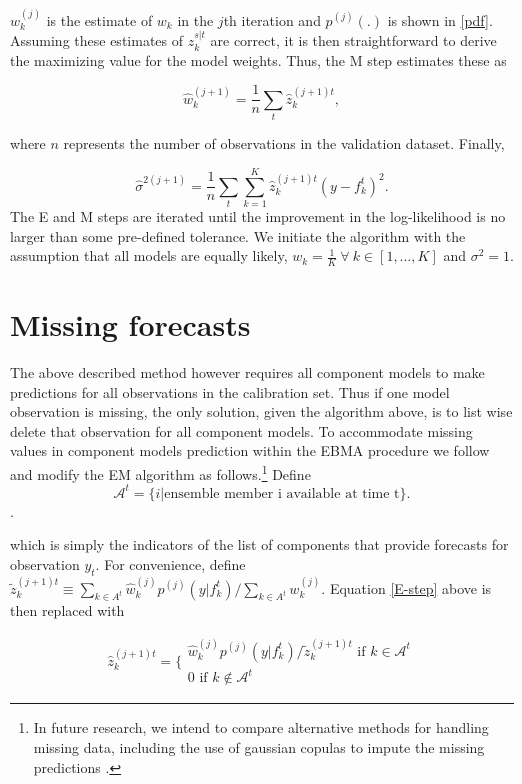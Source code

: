 \documentclass[12pt,fullpage,endnotes]{article}
\begin{document}
$w_k^{(j)}$ is the estimate of $w_k$ in the $j$th iteration and
$p^{(j)}(.)$ is shown in \eqref{pdf}.  Assuming these estimates of
$z_{k}^{s|t}$ are correct, it is then straightforward to derive the
maximizing value for the model weights. Thus, the M step estimates
these as 

\begin{equation}
\label{M-step}
\hat{w}^{(j+1)}_k=\frac{1}{n}\underset{t}{\sum}\hat{z}^{(j+1)t}_{k},
\end{equation}

\noindent where $n$ represents the number of observations in the
validation dataset.  Finally,

\begin{equation}
\label{sigma}
\hat{\sigma}^{2(j+1)}=\frac{1}{n}\underset{t}{\sum}\overset{K}{\underset{k=1}{\sum}}\hat{z}^{(j+1)t}_{k}(y-f_{k}^{t})^2.
\end{equation}
\noindent The E and M steps are iterated until the improvement in the
log-likelihood is no larger than some pre-defined tolerance.  We
initiate the algorithm with the assumption that all models are equally
likely, $w_k = \frac{1}{K} ~ \forall ~ k \in [1, \ldots, K]$ and
$\sigma^2=1$.


\section{Missing forecasts}
\label{missing}
The above described method however requires all component models to make predictions for all observations in the calibration set. Thus if one model observation is missing, the only solution, given the algorithm above, is to list wise delete that observation for all component models. To accommodate missing values in component models prediction within the EBMA procedure we follow \citet{Fraley:2010} and modify the EM algorithm as follows.\footnote{In future research, we intend to compare alternative methods for handling missing data, including the use of gaussian copulas to impute the missing predictions \citep{Hoff:2007}.}  Define $$\mathcal{A}^t = \{i|\mbox{ensemble member i available at time t}\}.$$.

\noindent which is simply the indicators of the list of components that provide forecasts for observation $y_t$.   For convenience, define $\tilde{z}_k^{(j+1)t} \equiv {{\underset{k \in A^t}{\sum}}\hat{w}^{(j)}_kp^{(j)}(y|f_{k}^{t})}/{\underset{k \in A^t}\sum w_k^{(j)}}$.  Equation \ref{E-step} above is then replaced with

\begin{equation}
\hat{z}^{(j+1)t}_{k} = \Bigg\{ \begin{array}{c} {\hat{w}^{(j)}_k p^{(j)}(y|f_{k}^{t})}/{\tilde{z}_k^{(j+1)t} } \mbox{ if } k \in \mathcal{A}^t\\ 0 \mbox{ if } k \notin \mathcal{A}^t \end{array}
\end{equation}
\end{document}
